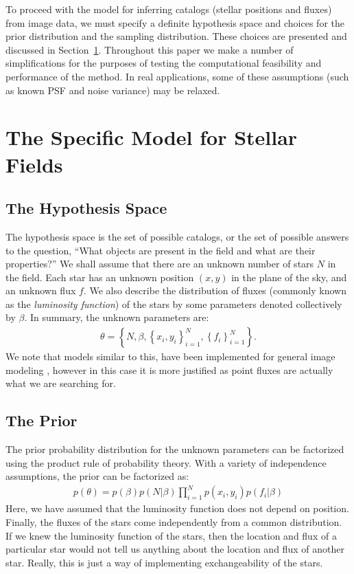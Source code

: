 \documentclass[manuscript]{aastex}
\begin{document}
To proceed with the model for inferring catalogs (stellar positions and fluxes)
from image data, we must
specify a definite hypothesis space and choices for the prior distribution
and the sampling distribution. These choices are presented and discussed in
Section~\ref{sec:model}. Throughout this paper we make a number of simplifications
for the purposes of testing the computational feasibility and performance of
the method. In real applications, some of these assumptions (such as known PSF
and noise variance) may be relaxed.

\section{The Specific Model for Stellar Fields}\label{sec:model}
\subsection{The Hypothesis Space}
The hypothesis space is the set of possible catalogs, or the set of possible
answers to the question, ``What objects are present in the field and
what are their properties?'' We shall assume that there are an unknown number of stars
$N$ in the field. Each star has an unknown
position $(x,y)$ in the plane of the sky, and an unknown flux $f$. We also
describe the distribution of fluxes (commonly known as the {\it luminosity
function}) of the stars by some parameters denoted collectively by $\beta$.
In summary, the unknown parameters are:
\begin{eqnarray}
\theta = \left\{N, \beta, \left\{x_i, y_i\right\}_{i=1}^N, 
\left\{f_i\right\}_{i=1}^N\right\}.
\end{eqnarray}
We note that models similar to this, have been implemented for general image
modeling \citep[e.g.][]{massinf}, however in this case it is more justified
as point fluxes are actually what we are searching for.

\subsection{The Prior}
The prior probability distribution for the unknown parameters can be factorized
using the product rule of probability theory.
With a variety of independence assumptions, the prior
can be factorized as:
\begin{eqnarray}
p(\theta) = p(\beta)p(N|\beta)\prod_{i=1}^N p(x_i, y_i)
p(f_i | \beta) 
\end{eqnarray}
Here, we have assumed that the luminosity function does not depend on position.
Finally, the fluxes of the stars come independently from
a common distribution. If we knew the luminosity
function of the stars, then the location and flux of a particular star would
not tell us anything about the location and flux of another star. Really, this
is just a way of implementing exchangeability of the stars.
\end{document}
